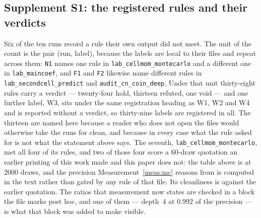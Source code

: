 \documentclass[11pt,a4paper]{article}
\theoremstyle{plain}
\theoremstyle{definition}
\theoremstyle{remark}
\begin{document}
\subsection*{Supplement S1: the registered rules and their verdicts}

Six of the ten runs record a rule their own output did not meet. The
unit of the count is the pair (run, label), because the labels are
local to their files and repeat across them: \texttt{N1} names one
rule in \texttt{lab\_cellmom\_montecarlo} and a different one in
\texttt{lab\_maincoef}, and \texttt{F1} and \texttt{F2} likewise name
different rules in \texttt{lab\_secondcell\_predict} and
\texttt{audit\_cn\_coin\_deep}. Under that unit thirty-eight rules
carry a verdict --- twenty-four hold, thirteen refuted, one void ---
and one further label, W3, sits under the same registration heading as
W1, W2 and W4 and is reported without a verdict, so thirty-nine labels
are registered in all. The thirteen are named here because a
reader who does not open the files would otherwise take the runs for
clean, and because in every case what the rule asked for is not what
the statement above says. The seventh,
\texttt{lab\_cellmom\_montecarlo}, met all four of its rules, and
two of those four score a $60$-draw quotation an earlier printing of
this work made and this paper does not: the table above is at $2000$
draws, and the precision Measurement~\ref{meas:mc} reasons from is
computed in the text rather than gated by any rule of that file. Its
cleanliness is against the earlier quotation. The ratios that
measurement now states are checked in a block the file marks post
hoc, and one of them --- depth~$4$ at $0.992$ of the precision ---
is what that block was added to make visible.
\end{document}
